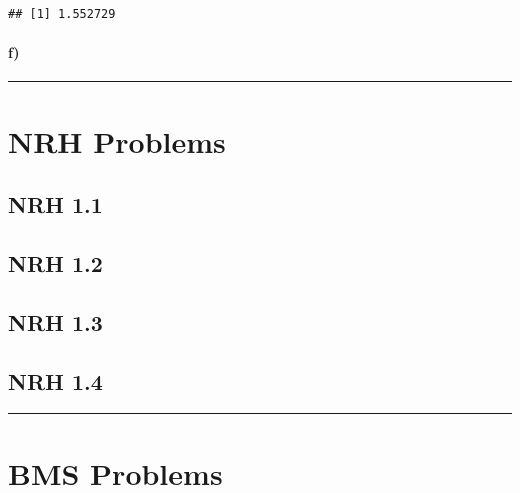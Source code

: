 \documentclass[
]{article}
\newenvironment{Shaded}{\begin{snugshade}}{\end{snugshade}}
\newcommand{\DecValTok}[1]{\textcolor[rgb]{0.00,0.00,0.81}{#1}}
\newcommand{\NormalTok}[1]{#1}
\newcommand{\OperatorTok}[1]{\textcolor[rgb]{0.81,0.36,0.00}{\textbf{#1}}}
\newcommand{\StringTok}[1]{\textcolor[rgb]{0.31,0.60,0.02}{#1}}
\begin{document}
\begin{Shaded}
\end{Shaded}

\begin{verbatim}
## [1] 1.552729
\end{verbatim}

\hypertarget{f}{%
\paragraph{\texorpdfstring{\textbf{f)}}{f)}}\label{f}}

\begin{center}\rule{0.5\linewidth}{0.5pt}\end{center}

\hypertarget{nrh-problems}{%
\section{NRH Problems}\label{nrh-problems}}

\hypertarget{nrh-1.1}{%
\subsection{NRH 1.1}\label{nrh-1.1}}

\hypertarget{nrh-1.2}{%
\subsection{NRH 1.2}\label{nrh-1.2}}

\hypertarget{nrh-1.3}{%
\subsection{NRH 1.3}\label{nrh-1.3}}

\hypertarget{nrh-1.4}{%
\subsection{NRH 1.4}\label{nrh-1.4}}

\begin{center}\rule{0.5\linewidth}{0.5pt}\end{center}

\hypertarget{bms-problems}{%
\section{BMS Problems}\label{bms-problems}}
\end{document}
